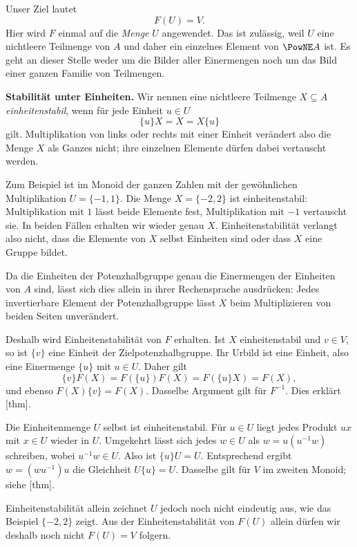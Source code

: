 Unser Ziel lautet
\begin{equation}
  F(U)=V.
  \tag{U}\label{reconstruction-reading-unitset}
\end{equation}
Hier wird \(F\) einmal auf die \emph{Menge} \(U\) angewendet.
Das ist zulässig, weil \(U\) eine nichtleere Teilmenge von \(A\)
und daher ein einzelnes Element von \(\PowNE A\) ist.
Es geht an dieser Stelle weder um die Bilder aller Einermengen
noch um das Bild einer ganzen Familie von Teilmengen.

\medskip\noindent\textbf{Stabilität unter Einheiten.}
Wir nennen eine nichtleere Teilmenge \(X\subseteq A\)
\emph{einheitenstabil}, wenn für jede Einheit \(u\in U\)
\[
  \{u\}X=X=X\{u\}
\]
gilt. Multiplikation von links oder rechts mit einer Einheit
verändert also die Menge \(X\) als Ganzes nicht; ihre einzelnen
Elemente dürfen dabei vertauscht werden.

Zum Beispiel ist im Monoid der ganzen Zahlen mit der gewöhnlichen
Multiplikation \(U=\{-1,1\}\). Die Menge \(X=\{-2,2\}\)
ist einheitenstabil: Multiplikation mit \(1\) lässt beide
Elemente fest, Multiplikation mit \(-1\) vertauscht sie.
In beiden Fällen erhalten wir wieder genau \(X\).
Einheitenstabilität verlangt also nicht, dass die Elemente
von \(X\) selbst Einheiten sind oder dass \(X\) eine Gruppe bildet.

Da die Einheiten der Potenzhalbgruppe
genau die Einermengen der Einheiten von \(A\) sind, lässt sich
dies allein in ihrer Rechensprache ausdrücken: Jedes invertierbare
Element der Potenzhalbgruppe lässt \(X\) beim Multiplizieren
von beiden Seiten unverändert.

Deshalb wird Einheitenstabilität von \(F\) erhalten. Ist \(X\)
einheitenstabil und \(v\in V\), so ist \(\{v\}\) eine Einheit der
Zielpotenzhalbgruppe. Ihr Urbild ist eine Einheit, also eine
Einermenge \(\{u\}\) mit \(u\in U\). Daher gilt
\[
  \{v\}F(X)=F(\{u\})F(X)=F(\{u\}X)=F(X),
\]
und ebenso \(F(X)\{v\}=F(X)\). Dasselbe Argument gilt für
\(F^{-1}\). Dies erklärt
[thm].

Die Einheitenmenge \(U\) selbst ist einheitenstabil.
Für \(u\in U\) liegt jedes Produkt \(ux\) mit \(x\in U\)
wieder in \(U\). Umgekehrt lässt sich jedes \(w\in U\) als
\(w=u(u^{-1}w)\) schreiben, wobei \(u^{-1}w\in U\).
Also ist \(\{u\}U=U\). Entsprechend ergibt
\(w=(wu^{-1})u\) die Gleichheit \(U\{u\}=U\).
Dasselbe gilt für \(V\) im zweiten Monoid; siehe
[thm].

Einheitenstabilität allein zeichnet \(U\) jedoch noch nicht
eindeutig aus, wie das Beispiel \(\{-2,2\}\) zeigt.
Aus der Einheitenstabilität von \(F(U)\) allein
dürfen wir deshalb noch nicht \(F(U)=V\) folgern.

